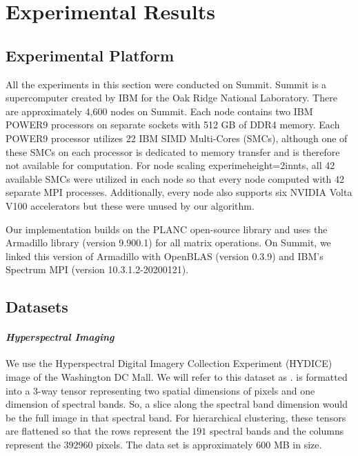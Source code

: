 
\section{Experimental Results}
\label{sec:results}

\subsection{Experimental Platform}
\label{sec:summit}

All the experiments in this section were conducted on Summit. Summit is a supercomputer created by IBM for the Oak Ridge National Laboratory. 
There are approximately 4,600 nodes on Summit. 
Each node contains two IBM POWER9 processors on separate sockets with 512 GB of DDR4 memory.
Each POWER9 processor utilizes 22 IBM SIMD Multi-Cores (SMCs), although one of these SMCs on each processor is dedicated to memory transfer and is therefore not available for computation. 
For node scaling experimeheight=2innts, all 42 available SMCs were utilized in each node so that every node computed with 42 separate MPI processes.
Additionally, every node also supports six NVIDIA Volta V100 accelerators but these were unused by our algorithm. 

Our implementation builds on the PLANC open-source library \cite{EH+19-TR} and uses the Armadillo library (version 9.900.1) for all matrix operations. 
On Summit, we linked this version of Armadillo with OpenBLAS (version 0.3.9) and IBM's Spectrum MPI (version 10.3.1.2-20200121).

\subsection{Datasets}

\paragraph{\emph{Hyperspectral Imaging}}

	We use the Hyperspectral Digital Imagery Collection Experiment (HYDICE) image of the Washington DC Mall. We will refer
	to this dataset as \hyper{}\cite{DC-HYDICE}.
	\hyper{} is formatted into a 3-way tensor representing two spatial dimensions of pixels and one dimension of spectral bands. So, a slice along
	the spectral band dimension would be the full \hyper{} image in that spectral band. For hierarchical clustering, these tensors are flattened so that the rows represent the
	$191$ spectral bands and the columns represent the $392960$ pixels.   The data set is approximately 600 MB in size.

